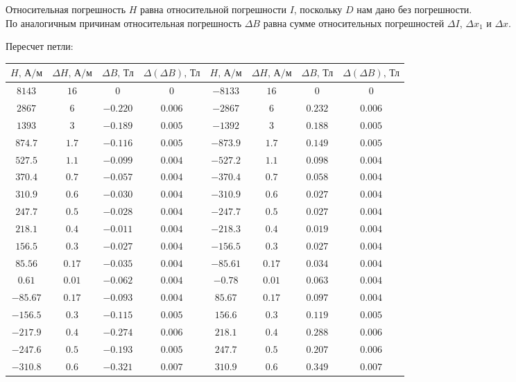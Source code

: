 \documentclass[a4paper]{article}
\begin{document}
\begin{enumerate}
Относительная погрешность $H$ равна относительной погрешности $I$, поскольку $D$ нам дано без погрешности.\\
По аналогичным причинам относительная погрешность $\Delta B$ равна сумме относительных погрешностей $\Delta I$, $\Delta x_1$ и $\Delta x$.

\newpage

Пересчет петли:
\begin{center}
\begin{tabular}{|c|c|c|c|c|c|c|c|}\hline
$H\text{, А/м}$&$\Delta H\text{, А/м}$&$\Delta B\text{, Тл}$&$\Delta (\Delta B)\text{, Тл}$&$H\text{, А/м}$&$\Delta H\text{, А/м}$&$\Delta B\text{, Тл}$&$\Delta (\Delta B)\text{, Тл}$\\\hline
$8143$&$16$&$0$&$0$&$-8133$&$16$&$0$&$0$\\\hline
$2867$&$6$&$-0.220$&$0.006$&$-2867$&$6$&$0.232$&$0.006$\\\hline
$1393$&$3$&$-0.189$&$0.005$&$-1392$&$3$&$0.188$&$0.005$\\\hline
$874.7$&$1.7$&$-0.116$&$0.005$&$-873.9$&$1.7$&$0.149$&$0.005$\\\hline
$527.5$&$1.1$&$-0.099$&$0.004$&$-527.2$&$1.1$&$0.098$&$0.004$\\\hline
$370.4$&$0.7$&$-0.057$&$0.004$&$-370.4$&$0.7$&$0.058$&$0.004$\\\hline
$310.9$&$0.6$&$-0.030$&$0.004$&$-310.9$&$0.6$&$0.027$&$0.004$\\\hline
$247.7$&$0.5$&$-0.028$&$0.004$&$-247.7$&$0.5$&$0.027$&$0.004$\\\hline
$218.1$&$0.4$&$-0.011$&$0.004$&$-218.3$&$0.4$&$0.019$&$0.004$\\\hline
$156.5$&$0.3$&$-0.027$&$0.004$&$-156.5$&$0.3$&$0.027$&$0.004$\\\hline
$85.56$&$0.17$&$-0.035$&$0.004$&$-85.61$&$0.17$&$0.034$&$0.004$\\\hline
$0.61$&$0.01$&$-0.062$&$0.004$&$-0.78$&$0.01$&$0.063$&$0.004$\\\hline
$-85.67$&$0.17$&$-0.093$&$0.004$&$85.67$&$0.17$&$0.097$&$0.004$\\\hline
$-156.5$&$0.3$&$-0.115$&$0.005$&$156.6$&$0.3$&$0.119$&$0.005$\\\hline
$-217.9$&$0.4$&$-0.274$&$0.006$&$218.1$&$0.4$&$0.288$&$0.006$\\\hline
$-247.6$&$0.5$&$-0.193$&$0.005$&$247.7$&$0.5$&$0.207$&$0.006$\\\hline
$-310.8$&$0.6$&$-0.321$&$0.007$&$310.9$&$0.6$&$0.349$&$0.007$\\\hline

\end{tabular}
\end{center}
\end{enumerate}
\end{document}
